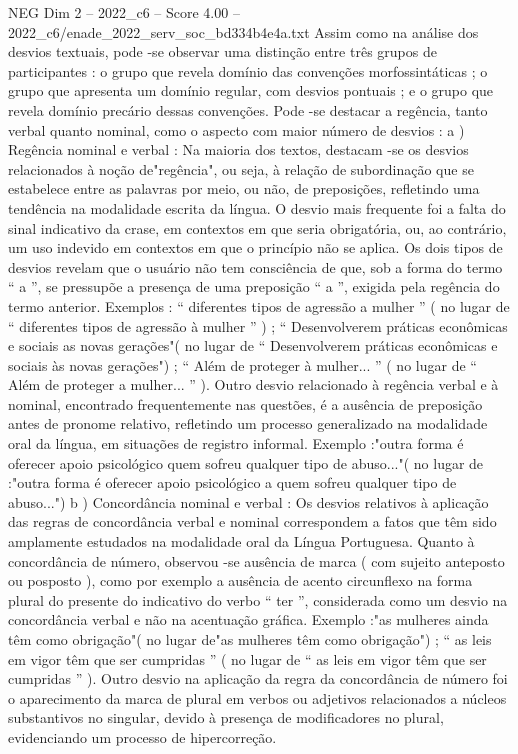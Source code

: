 \begin{textsample}{NEG Dim 2 – 2022\_c6 – Score 4.00 – 2022\_c6/enade\_2022\_serv\_soc\_bd334b4e4a.txt}
Assim como na análise dos desvios textuais, pode -se observar uma distinção entre três grupos de participantes : o grupo que revela domínio das convenções morfossintáticas ; o grupo que apresenta um domínio regular, com desvios pontuais ; e o grupo que revela domínio precário dessas convenções.
Pode -se destacar a regência, tanto verbal quanto nominal, como o aspecto com maior número de desvios : a ) Regência nominal e verbal : Na maioria dos textos, destacam -se os desvios relacionados à noção de"regência", ou seja, à relação de subordinação que se estabelece entre as palavras por meio, ou não, de preposições, refletindo uma tendência na modalidade escrita da língua.
O desvio mais frequente foi a falta do sinal indicativo da crase, em contextos em que seria obrigatória, ou, ao contrário, um uso indevido em contextos em que o princípio não se aplica.
Os dois tipos de desvios revelam que o usuário não tem consciência de que, sob a forma do termo “ a ”, se pressupõe a presença de uma preposição “ a ”, exigida pela regência do termo anterior.
Exemplos : “ diferentes tipos de agressão a mulher ” ( no lugar de “ diferentes tipos de agressão à mulher ” ) ; “ Desenvolverem práticas econômicas e sociais as novas gerações"( no lugar de “ Desenvolverem práticas econômicas e sociais às novas gerações") ; “ Além de proteger à mulher... ” ( no lugar de “ Além de proteger a mulher... ” ).
Outro desvio relacionado à regência verbal e à nominal, encontrado frequentemente nas questões, é a ausência de preposição antes de pronome relativo, refletindo um processo generalizado na modalidade oral da língua, em situações de registro informal.
Exemplo :"outra forma é oferecer apoio psicológico quem sofreu qualquer tipo de abuso..."( no lugar de :"outra forma é oferecer apoio psicológico a quem sofreu qualquer tipo de abuso...") b ) Concordância nominal e verbal : Os desvios relativos à aplicação das regras de concordância verbal e nominal correspondem a fatos que têm sido amplamente estudados na modalidade oral da Língua Portuguesa.
Quanto à concordância de número, observou -se ausência de marca ( com sujeito anteposto ou posposto ), como por exemplo a ausência de acento circunflexo na forma plural do presente do indicativo do verbo “ ter ”, considerada como um desvio na concordância verbal e não na acentuação gráfica.
Exemplo :"as mulheres ainda têm como obrigação"( no lugar de"as mulheres têm como obrigação") ; “ as leis em vigor têm que ser cumpridas ” ( no lugar de “ as leis em vigor têm que ser cumpridas ” ).
Outro desvio na aplicação da regra da concordância de número foi o aparecimento da marca de plural em verbos ou adjetivos relacionados a núcleos substantivos no singular, devido à presença de modificadores no plural, evidenciando um processo de hipercorreção.

\end{textsample}
